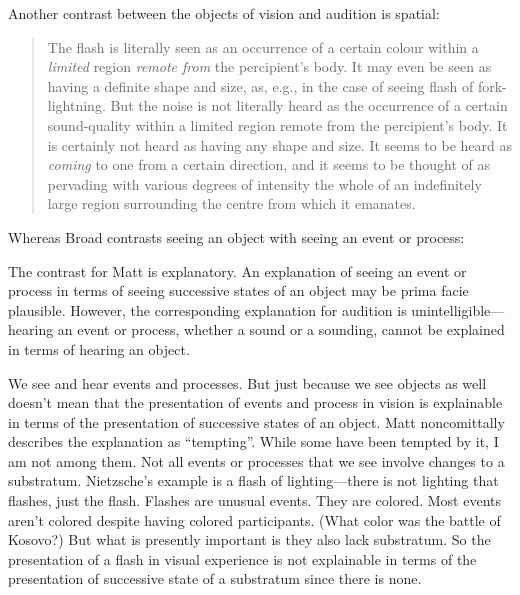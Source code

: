 \documentclass[12pt]{article}
\begin{document}
Another contrast between the objects of vision and audition is spatial:
\begin{quote}
	The flash is literally seen as an occurrence of a certain colour within a \emph{limited} region \emph{remote from} the percipient's body. It may even be seen as having a definite shape and size, as, e.g., in the case of seeing flash of fork-lightning. But the noise is not literally heard as the occurrence of a certain sound-quality within a limited region remote from the percipient's body. It is certainly not heard as having any shape and size. It seems to be heard as \emph{coming} to one from a certain direction, and it seems to be thought of as pervading with various degrees of intensity the whole of an indefinitely large region surrounding the centre from which it emanates. \citep[32]{Broad:1965dq}
\end{quote}


Whereas Broad contrasts seeing an object with seeing an event or process: 
\begin{quote}
	
\end{quote}
The contrast for Matt is explanatory. An explanation of seeing an event or process in terms of seeing successive states of an object may be prima facie plausible. However, the corresponding explanation for audition is unintelligible---hearing an event or process, whether a sound or a sounding, cannot be explained in terms of hearing an object. 

We see and hear events and processes. But just because we see objects as well doesn't mean that the presentation of events and process in vision is explainable in terms of the presentation of successive states of an object. Matt noncomittally describes the explanation as ``tempting''. While some have been tempted by it, I am not among them. Not all events or processes that we see involve changes to a substratum. Nietzsche's example is a flash of lighting---there is not lighting that flashes, just the flash. Flashes are unusual events. They are colored. Most events aren't colored despite having colored participants. (What color was the battle of Kosovo?) But what is presently important is they also lack substratum. So the presentation of a flash in visual experience is not explainable in terms of the presentation of successive state of a substratum since there is none.




 
 
\end{document}
